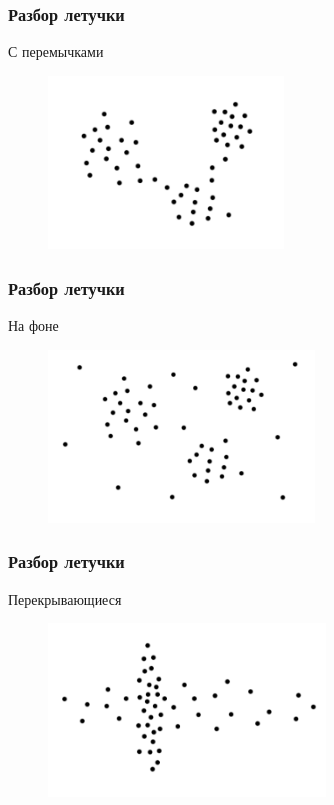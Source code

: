 \documentclass[12pt]{beamer}
\begin{document}
\begin{frame}\frametitle{Разбор летучки}
С перемычками\\
\vspace{5mm}
\begin{figure}[htbp]
  \includegraphics[height=130pt, keepaspectratio = true]{images/cluster4}  
\end{figure}
\end{frame}

\begin{frame}\frametitle{Разбор летучки}
На фоне\\
\vspace{5mm}
\begin{figure}[htbp]
  \includegraphics[height=130pt, keepaspectratio = true]{images/cluster5}  
\end{figure}
\end{frame}

\begin{frame}\frametitle{Разбор летучки}
Перекрывающиеся\\
\vspace{5mm}
\begin{figure}[htbp]
  \includegraphics[height=130pt, keepaspectratio = true]{images/cluster6}  
\end{figure}
\end{frame}
\end{document}
